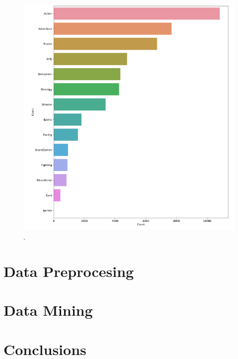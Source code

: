\documentclass{book}
\begin{document}
    \begin{figure}[H]\label{fig:plotGenre}
        \centering
        \includegraphics{plot-genres}
        \caption{.}
    \end{figure}

    \chapter{Data Preprocesing}
    \chapter{Data Mining}
    \chapter{Conclusions}
\end{document}
